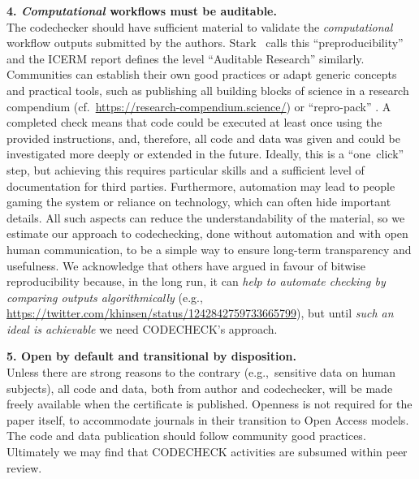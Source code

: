 \documentclass[12pt]{article}
\newcommand{\rev}[1]{\textit{#1}}
\begin{document}
\textbf{4. \rev{Computational} workflows must be auditable.} \\
The codechecker should have sufficient material to validate the
\rev{computational} workflow outputs submitted by the
authors. Stark~\cite{stark_before_2018} calls this
``preproducibility'' and the ICERM report \cite{stodden_setting_2013}
defines the level ``Auditable Research'' similarly.  Communities can
establish their own good practices or adapt generic concepts and
practical tools, such as publishing all building blocks of science in
a research compendium (cf.~\url{https://research-compendium.science/})
or ``repro-pack'' \cite{barba_praxis_2018}.  A completed check means
that code could be executed at least once using the provided
instructions, and, therefore, all code and data was given and could be
investigated more deeply or extended in the future.  Ideally, this is
a ``one~click'' step, but achieving this requires particular skills
and a sufficient level of documentation for third
parties. Furthermore, automation may lead to people gaming the system
or reliance on technology, which can often hide important details.
All such aspects can reduce the understandability of the material, so
we estimate our approach to codechecking, done without automation and
with open human communication, to be a simple way to ensure long-term
transparency and usefulness.  We acknowledge that others have argued
in favour of bitwise reproducibility because, in the long run, it can
\rev{help to automate checking by comparing outputs algorithmically} (e.g.,
\url{https://twitter.com/khinsen/status/1242842759733665799}), but
until \rev{such an ideal is achievable} we need CODECHECK's approach.

\textbf{5. Open by default and transitional by disposition.} \\
Unless there are strong reasons to the contrary
(e.g.,~sensitive data on human subjects), all code and data, both from
author and codechecker, will be made freely available when
the certificate is published.  Openness is not required for the paper
itself, to accommodate journals in their transition to
Open Access models.  The code and data publication should follow
community good practices.  Ultimately we may find that CODECHECK activities are
subsumed within peer review.
\end{document}
